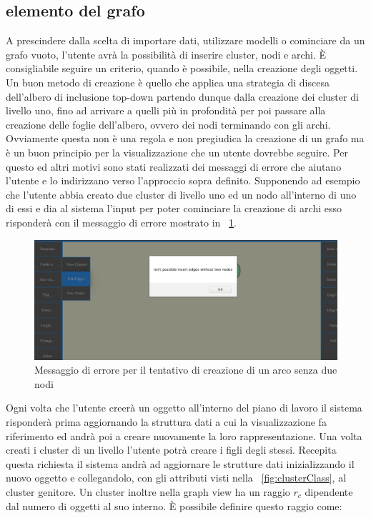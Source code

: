 {\subsection{elemento del grafo}
A prescindere dalla scelta di importare dati, utilizzare modelli o cominciare da un grafo vuoto, l'utente avrà la possibilità di inserire cluster, nodi e archi. È consigliabile seguire un criterio, quando è possibile, nella creazione degli oggetti. Un buon metodo di creazione è quello che applica una strategia di discesa dell'albero di inclusione top-down partendo dunque dalla creazione dei cluster di livello uno, fino ad arrivare a quelli più in profondità per poi passare alla creazione delle foglie dell'albero, ovvero dei nodi terminando con gli archi. Ovviamente questa non è una regola e non pregiudica la creazione di un grafo ma è un buon principio per la visualizzazione che un utente dovrebbe seguire. Per questo ed altri motivi sono stati realizzati dei messaggi di errore che aiutano l'utente e lo indirizzano verso l'approccio sopra definito. Supponendo ad esempio che l'utente abbia creato due cluster di livello uno ed un nodo all'interno di uno di essi e dia al sistema l'input per poter cominciare la creazione di archi esso risponderà con il messaggio di errore mostrato in \figurename~\ref{fig:erroreArco}.
\begin{figure}[!htb]
	\begin{center}
		\includegraphics[width=0.8 \linewidth]{figure/erroreArco}
	\end{center}
	\caption{Messaggio di errore per il tentativo di creazione di un arco senza due nodi\label{fig:erroreArco}}
\end{figure}
Ogni volta che l'utente creerà un oggetto all'interno del piano di lavoro il sistema risponderà prima aggiornando la struttura dati a cui la visualizzazione fa riferimento ed andrà poi a creare nuovamente la loro rappresentazione. Una volta creati i cluster di un livello l'utente potrà creare i figli degli stessi. Recepita questa richiesta il sistema andrà ad aggiornare le strutture dati inizializzando il nuovo oggetto e collegandolo, con gli attributi visti nella \figurename~\ref{fig:clusterClass}, al cluster genitore. Un cluster inoltre nella graph view ha un raggio $r_c$ dipendente dal numero di oggetti al suo interno. È possibile definire questo raggio come: 
}

